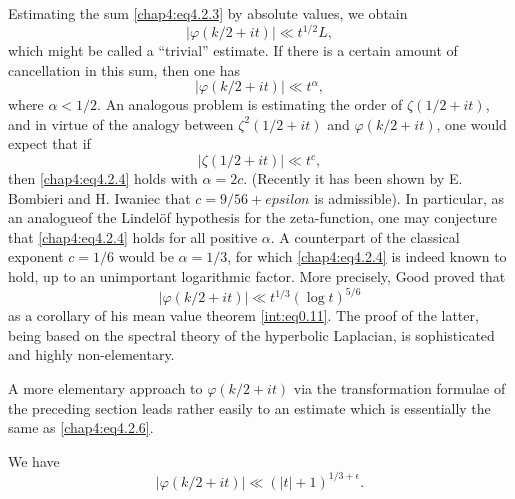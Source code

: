Estimating the sum \eqref{chap4:eq4.2.3} by absolute values, we obtain
$$
\left|\varphi(k /2+it)\right|\ll t^{1/2}L,
$$
which might be called a ``trivial'' estimate. If there is a certain amount of cancellation in this sum, then one has 
\begin{equation}\label{chap4:eq4.2.4}
\left|\varphi(k /2+it)\right|\ll t^\alpha,
\end{equation}
where $\alpha < 1/2$. An analogous problem is estimating the order of $\zeta(1/2+it)$, and in virtue of the analogy between $\zeta^2(1/2+it)$ and $\varphi(k /2+it)$, one would expect that if 
\begin{equation}\label{chap4:eq4.2.5}
\left|\zeta(1/2+it)\right|\ll t^c,
\end{equation}
then \eqref{chap4:eq4.2.4} holds with $\alpha =2c$. (Recently it has
been shown by E. Bombieri and H. Iwaniec that $c=9/56+epsilon$ is
admissible). In particular, as an analogue\pageoriginale of the
Lindel\"of hypothesis for the zeta-function, one may conjecture that
\eqref{chap4:eq4.2.4} holds for all positive $\alpha$. A counterpart of
the classical exponent $c=1/6$ would be $\alpha=1/3$, for which
\eqref{chap4:eq4.2.4} is indeed known to hold, up to an unimportant
logarithmic factor. More precisely, Good \cite{key9} proved that 
\begin{equation}\label{chap4:eq4.2.6}
\left|\varphi(k /2+it)\right|\ll t^{1/3}(\log t)^{5/6}
\end{equation}
as a corollary of his mean value theorem \eqref{int:eq0.11}. The proof
of the latter, being based on the spectral theory of the hyperbolic
Laplacian, is sophisticated and highly non-elementary. 

A more elementary approach to $\varphi(k /2+it)$ via the transformation formulae of the preceding section leads rather easily to an estimate which is essentially the same as \eqref{chap4:eq4.2.6}.

\begin{thm}\label{chap4:thm4.5}
We have 
\begin{equation}\label{chap4:eq4.2.7}
\left|\varphi(k /2+it)\right|\ll (|t|+1)^{1/3+\epsilon}.
\end{equation}
\end{thm}

